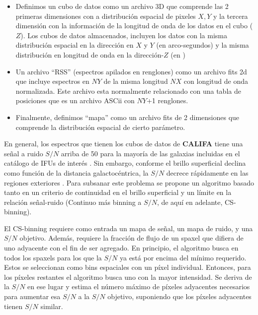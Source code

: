 \begin{itemize}

\item Definimos un cubo de datos como un archivo 3D que comprende las 2 primeras dimensiones con a distribución espacial de pixeles $X,Y$ y la tercera dimensión con la información de la longitud de onda de los datos en el cubo ($Z$). Los cubos de datos almacenados, incluyen los datos con la misma distribución espacial en la dirección en $X$ y $Y$ (en arco-segundos) y la misma distribución en longitud de onda en la dirección-$Z$ (en \text{\AA})

\item Un archivo ``RSS'' (espectros apilados en renglones) como un archivo fits 2d que incluye espectros en $NY$ de la misma longitud $NX$ con longitud de onda normalizada. Este archivo esta normalmente relacionado con una tabla de posiciones que es un archivo ASCii con $NY$+1 renglones.

\item Finalmente, definimos ``mapa'' como un archivo fits de 2 dimensiones que comprende la distribución espacial de cierto parámetro.

\end{itemize}



\noindent En general, los espectros que tienen los cubos de datos de \textbf{CALIFA} tiene una señal a ruido $S/N$ arriba de 50 para la mayoría de las galaxias incluidas en el catálogo de IFUs de interés \citep{sanchez2012}. Sin embargo, conforme el brillo superficial declina como función de la distancia galactocéntrica, la $S/N$ decrece rápidamente en las regiones exteriores \citep{sanchez2012}. Para subsanar este problema se  propone un algoritmo basado tanto en un criterio de continuidad en el brillo superficial y un límite en la relación señal-ruido (Continuo más binning a $S/N$, de aquí en adelante, CS-binning).

\bigskip

\noindent El CS-binning \citep{pipe2} requiere como entrada un mapa de señal, un mapa de ruido, y una  $S/N$ objetivo. Además, requiere la fracción de flujo de un spaxel que difiera de uno adyacente con el fin de ser agregado. En principio, el algoritmo busca en todos los spaxels para los que la $S/N$ ya está por encima del mínimo requerido. Estos se seleccionan como bins espaciales con un
píxel individual. Entonces, para los píxeles restantes el algoritmo busca uno con la mayor intensidad. Se deriva de la $S/N$ en ese lugar y estima el número máximo de píxeles adyacentes necesarios para aumentar esa $S/N$ a la $S/N$ objetivo, suponiendo que los píxeles adyacentes tienen $S/N$ similar.

